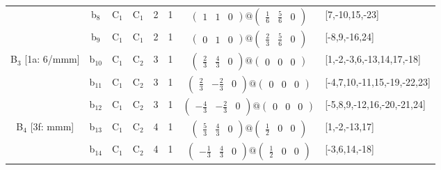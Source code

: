 \documentclass[fleqn,10pt,landscape]{article}
\begin{document}
\begin{itemize}
\begin{center}
\begin{longtable}{cc|cc|c|c|c|l}
& b$_{8}$ & C$_{1}$ & C$_{1}$ & 2 & 1 & $\begin{pmatrix} 1 & 1 & 0 \end{pmatrix}@\begin{pmatrix} \frac{1}{6} & \frac{5}{6} & 0 \end{pmatrix}$ & [7,-10,15,-23] \\
& b$_{9}$ & C$_{1}$ & C$_{1}$ & 2 & 1 & $\begin{pmatrix} 0 & 1 & 0 \end{pmatrix}@\begin{pmatrix} \frac{2}{3} & \frac{5}{6} & 0 \end{pmatrix}$ & [-8,9,-16,24] \\ \hline
B$_{3}$ [1a: 6/mmm] & b$_{10}$ & C$_{1}$ & C$_{2}$ & 3 & 1 & $\begin{pmatrix} \frac{2}{3} & \frac{4}{3} & 0 \end{pmatrix}@\begin{pmatrix} 0 & 0 & 0 \end{pmatrix}$ & [1,-2,-3,6,-13,14,17,-18] \\
& b$_{11}$ & C$_{1}$ & C$_{2}$ & 3 & 1 & $\begin{pmatrix} \frac{2}{3} & - \frac{2}{3} & 0 \end{pmatrix}@\begin{pmatrix} 0 & 0 & 0 \end{pmatrix}$ & [-4,7,10,-11,15,-19,-22,23] \\
& b$_{12}$ & C$_{1}$ & C$_{2}$ & 3 & 1 & $\begin{pmatrix} - \frac{4}{3} & - \frac{2}{3} & 0 \end{pmatrix}@\begin{pmatrix} 0 & 0 & 0 \end{pmatrix}$ & [-5,8,9,-12,16,-20,-21,24] \\ \hline
B$_{4}$ [3f: mmm] & b$_{13}$ & C$_{1}$ & C$_{2}$ & 4 & 1 & $\begin{pmatrix} \frac{5}{3} & \frac{4}{3} & 0 \end{pmatrix}@\begin{pmatrix} \frac{1}{2} & 0 & 0 \end{pmatrix}$ & [1,-2,-13,17] \\
& b$_{14}$ & C$_{1}$ & C$_{2}$ & 4 & 1 & $\begin{pmatrix} - \frac{1}{3} & \frac{4}{3} & 0 \end{pmatrix}@\begin{pmatrix} \frac{1}{2} & 0 & 0 \end{pmatrix}$ & [-3,6,14,-18] \\

\end{longtable}
\end{center}
\end{itemize}
\end{document}
